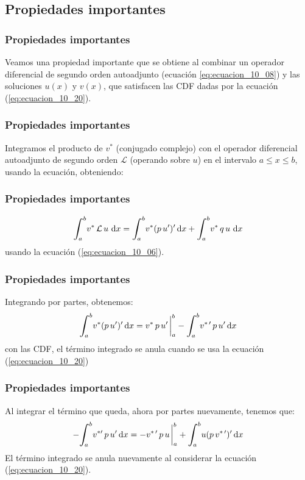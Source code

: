 \documentclass[12pt]{beamer}
\begin{document}
\subsection{Propiedades importantes}

\begin{frame}
\frametitle{Propiedades importantes}
Veamos una propiedad importante que se obtiene al combinar un operador diferencial de segundo orden autoadjunto (ecuación \ref{eq:ecuacion_10_08}) y las soluciones $u(x)$ y $v(x)$, que satisfacen las CDF dadas por la ecuación (\ref{eq:ecuacion_10_20}).
\end{frame}
\begin{frame}
\frametitle{Propiedades importantes}
Integramos el producto de $v^{*}$ (conjugado complejo) con el operador diferencial autoadjunto de segundo orden $\mathcal{L}$ (operando sobre $u$) en el intervalo $a \leq x \leq b$, usando la ecuación, obteniendo:
\end{frame}
\begin{frame}
\frametitle{Propiedades importantes}
\begin{align}
\scaleint{6ex}_{\bs a}^{b} v^{*} \, \mathcal{L} \, u \, \dd{x} = \scaleint{6ex}_{\bs a}^{b} v^{*} (p \, \pderivada{u})^{\prime} \dd{x} + \scaleint{6ex}_{\bs a}^{b} v^{*} \, q \, u \, \dd{x}
\label{eq:ecuacion_10_22}
\end{align}
usando la ecuación (\ref{eq:ecuacion_10_06}).
\end{frame}
\begin{frame}
\frametitle{Propiedades importantes}
Integrando por partes, obtenemos:
\pause
\begin{align}
\scaleint{6ex}_{\bs a}^{b} v^{*}(p \, \pderivada{u})^{\prime} \dd{x} = v^{*} \, p \, \pderivada{u} \eval_{a}^{b} - \scaleint{6ex}_{\bs a}^{b} v^{* \, \prime} \, p \, \pderivada{u} \dd{x}
\label{eq:ecuacion_10_23}
\end{align}
con las CDF, el término integrado se anula cuando se usa la ecuación (\ref{eq:ecuacion_10_20})
\end{frame}
\begin{frame}
\frametitle{Propiedades importantes}
Al integrar el término que queda, ahora por partes nuevamente, tenemos que:
\pause
\begin{align}
- \scaleint{6ex}_{\bs a}^{b} v^{* \prime} \, p \, \pderivada{u} \dd{x} = - v^{* \, \prime} \, p \, u \eval_{a}^{b} + \scaleint{6ex}_{\bs a}^{b} u(p \, v^{* \, \prime})^{\prime} \dd{x}
\label{eq:ecuacion_10_24}
\end{align}
El término integrado se anula nuevamente al considerar la ecuación (\ref{eq:ecuacion_10_20}).
\end{frame}
\end{document}
